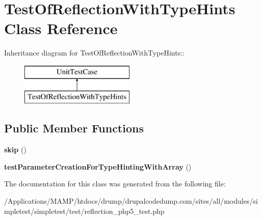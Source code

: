 \hypertarget{class_test_of_reflection_with_type_hints}{
\section{TestOfReflectionWithTypeHints Class Reference}
\label{class_test_of_reflection_with_type_hints}
}
Inheritance diagram for TestOfReflectionWithTypeHints::\begin{figure}[H]
\begin{center}
\leavevmode
\includegraphics[height=2cm]{class_test_of_reflection_with_type_hints}
\end{center}
\end{figure}
\subsection*{Public Member Functions}
\begin{DoxyCompactItemize}
\item 
\hypertarget{class_test_of_reflection_with_type_hints_a47399b497503831946b156eaaccc7d3d}{
{\bfseries skip} ()}
\label{class_test_of_reflection_with_type_hints_a47399b497503831946b156eaaccc7d3d}

\item 
\hypertarget{class_test_of_reflection_with_type_hints_a3fbf862ffaba69571d7df4f8a54cbdd8}{
{\bfseries testParameterCreationForTypeHintingWithArray} ()}
\label{class_test_of_reflection_with_type_hints_a3fbf862ffaba69571d7df4f8a54cbdd8}

\end{DoxyCompactItemize}


The documentation for this class was generated from the following file:\begin{DoxyCompactItemize}
\item 
/Applications/MAMP/htdocs/drump/drupalcodedump.com/sites/all/modules/simpletest/simpletest/test/reflection\_\-php5\_\-test.php\end{DoxyCompactItemize}
